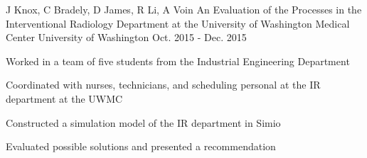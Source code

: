 \begin{cventries}
  \cventry
    {J Knox, C Bradely, D James, R Li, A Voin} %
    {An Evaluation of the Processes in the Interventional Radiology Department at the University of Washington Medical Center} %
    {University of Washington} %
    {Oct. 2015 - Dec. 2015} %
    {
      \begin{cvitems} %
        \item {Worked in a team of five students from the Industrial Engineering Department}
        \item {Coordinated with nurses, technicians, and scheduling personal at the IR department at the UWMC}
        \item {Constructed a simulation model of the IR department in Simio}
        \item {Evaluated possible solutions and presented a recommendation}
      \end{cvitems}
    }




\end{cventries}
